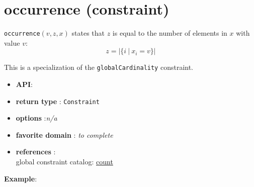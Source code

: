 \label{occurrence}
\hypertarget{occurrence}{}

\section{occurrence (constraint)}\label{occurrence:occurrenceconstraint}\hypertarget{occurrence:occurrenceconstraint}{}
\begin{notedef}
  \texttt{occurrence}$(v,z,x)$ states that $z$ is equal to the number of elements in $x$ with value $v$:
$$z=|\{i\ |\ x_i=v\}|$$   
\end{notedef}
  This is a specialization of the \texttt{globalCardinality} constraint.

\begin{itemize}
	\item \textbf{API}: 
	\item \textbf{return type} : \texttt{Constraint}
	\item \textbf{options} :\emph{n/a}
	\item \textbf{favorite domain} : \emph{to complete}
	\item \textbf{references} :\\
      global constraint catalog: \href{http://www.emn.fr/x-info/sdemasse/gccat/Ccount.html}{count}
\end{itemize}

\textbf{Example}:
